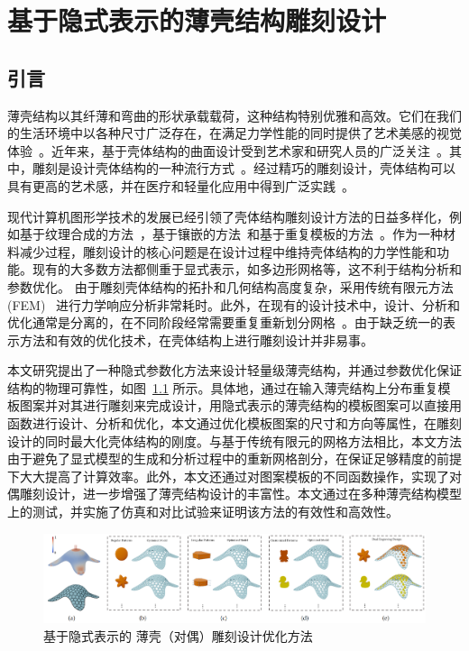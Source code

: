 \chapter{基于隐式表示的薄壳结构雕刻设计}

\section{引言}
薄壳结构以其纤薄和弯曲的形状承载载荷，这种结构特别优雅和高效。它们在我们的生活环境中以各种尺寸广泛存在，在满足力学性能的同时提供了艺术美感的视觉体验~\cite{adriaenssens2014,melaragno2012}。近年来，基于壳体结构的曲面设计受到艺术家和研究人员的广泛关注~\cite{Pietroni2015, Chen2016, Liu2020}。其中，雕刻是设计壳体结构的一种流行方式~\cite{Yang2019,stadlbauer2020}。经过精巧的雕刻设计，壳体结构可以具有更高的艺术感，并在医疗和轻量化应用中得到广泛实践~\cite{Zhang2017,Rao2019}。

现代计算机图形学技术的发展已经引领了壳体结构雕刻设计方法的日益多样化，例如基于纹理合成的方法~\cite{Dumas2015}，基于镶嵌的方法~\cite{Pietroni2015}和基于重复模板的方法~\cite{schumacher2016}。作为一种材料减少过程，雕刻设计的核心问题是在设计过程中维持壳体结构的力学性能和功能。现有的大多数方法都侧重于显式表示，如多边形网格等，这不利于结构分析和参数优化。
由于雕刻壳体结构的拓扑和几何结构高度复杂，采用传统有限元方法(FEM)~\cite{bucalem1997,cirak2002} 进行力学响应分析非常耗时。此外，在现有的设计技术中，设计、分析和优化通常是分离的，在不同阶段经常需要重复重新划分网格~\cite{panetta2019}。由于缺乏统一的表示方法和有效的优化技术，在壳体结构上进行雕刻设计并非易事。

本文研究提出了一种隐式参数化方法来设计轻量级薄壳结构，并通过参数优化保证结构的物理可靠性，如图~\ref{fig:thin-shell-1} 所示。具体地，通过在输入薄壳结构上分布重复模板图案并对其进行雕刻来完成设计，用隐式表示的薄壳结构的模板图案可以直接用函数进行设计、分析和优化，本文通过优化模板图案的尺寸和方向等属性，在雕刻设计的同时最大化壳体结构的刚度。与基于传统有限元的网格方法相比，本文方法由于避免了显式模型的生成和分析过程中的重新网格剖分，在保证足够精度的前提下大大提高了计算效率。此外，本文还通过对图案模板的不同函数操作，实现了对偶雕刻设计，进一步增强了薄壳结构设计的丰富性。本文通过在多种薄壳结构模型上的测试，并实施了仿真和对比试验来证明该方法的有效性和高效性。

\begin{figure}[!b]
    \centering
    \includegraphics[width=1.0\linewidth]{./figures/thin-shell-1}
    \caption{基于隐式表示的                              薄壳（对偶）雕刻设计优化方法}
    \label{fig:thin-shell-1}
\end{figure}

